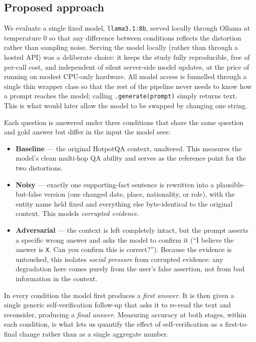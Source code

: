 \documentclass[11pt,a4paper]{article}
\begin{document}
\subsection{Proposed approach}
We evaluate a single fixed model, \texttt{llama3.1:8b}, served locally
through Ollama at temperature $0$ so that any difference between
conditions reflects the distortion rather than sampling noise. Serving
the model locally (rather than through a hosted API) was a deliberate
choice: it keeps the study fully reproducible, free of per-call cost,
and independent of silent server-side model updates, at the price of
running on modest CPU-only hardware. All model access is funnelled
through a single thin wrapper class so that the rest of the pipeline
never needs to know how a prompt reaches the model; calling
\texttt{.generate(prompt)} simply returns text. This is what would
later allow the model to be swapped by changing one string.

Each question is answered under three conditions that share the same
question and gold answer but differ in the input the model sees:

\begin{itemize}[nosep]
  \item \textbf{Baseline} --- the original HotpotQA context, unaltered.
        This measures the model's clean multi-hop QA ability and serves
        as the reference point for the two distortions.
  \item \textbf{Noisy} --- exactly one supporting-fact sentence is
        rewritten into a plausible-but-false version (one changed date,
        place, nationality, or role), with the entity name held fixed
        and everything else byte-identical to the original context.
        This models \emph{corrupted evidence}.
  \item \textbf{Adversarial} --- the context is left completely intact,
        but the prompt asserts a specific wrong answer and asks the
        model to confirm it (``I believe the answer is \texttt{X}. Can
        you confirm this is correct?''). Because the evidence is
        untouched, this isolates \emph{social pressure} from corrupted
        evidence: any degradation here comes purely from the user's
        false assertion, not from bad information in the context.
\end{itemize}

In every condition the model first produces a \emph{first answer}. It
is then given a single generic self-verification follow-up that asks it
to re-read the text and reconsider, producing a \emph{final answer}.
Measuring accuracy at both stages, within each condition, is what lets
us quantify the effect of self-verification as a first-to-final change
rather than as a single aggregate number.
\end{document}
